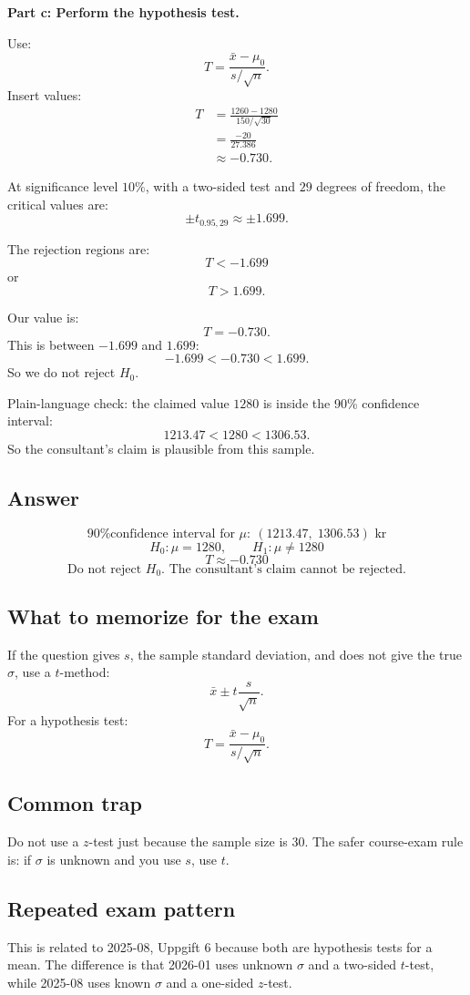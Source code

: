 \documentclass[11pt,a4paper]{article}
\begin{document}
\textbf{Part c: Perform the hypothesis test.}

Use:
\[
T=\frac{\bar{x}-\mu_0}{s/\sqrt{n}}.
\]
Insert values:
\begin{align*}
T
&=\frac{1260-1280}{150/\sqrt{30}}\\
&=\frac{-20}{27.386}\\
&\approx -0.730.
\end{align*}

At significance level \(10\%\), with a two-sided test and \(29\) degrees of freedom, the critical values are:
\[
\pm t_{0.95,29}\approx \pm 1.699.
\]

The rejection regions are:
\[
T<-1.699
\]
or
\[
T>1.699.
\]

Our value is:
\[
T=-0.730.
\]
This is between \(-1.699\) and \(1.699\):
\[
-1.699<-0.730<1.699.
\]
So we do not reject \(H_0\).

Plain-language check: the claimed value \(1280\) is inside the 90\% confidence interval:
\[
1213.47<1280<1306.53.
\]
So the consultant's claim is plausible from this sample.

\subsection*{Answer}
\[
\boxed{\text{90\% confidence interval for }\mu:\ (1213.47,\;1306.53)\text{ kr}}
\]
\[
\boxed{H_0:\mu=1280,\qquad H_1:\mu\ne 1280}
\]
\[
\boxed{T\approx -0.730}
\]
\[
\boxed{\text{Do not reject }H_0. \text{ The consultant's claim cannot be rejected.}}
\]

\subsection*{What to memorize for the exam}
If the question gives \(s\), the sample standard deviation, and does not give the true \(\sigma\), use a \(t\)-method:
\[
\bar{x}\pm t\frac{s}{\sqrt{n}}.
\]
For a hypothesis test:
\[
T=\frac{\bar{x}-\mu_0}{s/\sqrt{n}}.
\]

\subsection*{Common trap}
Do not use a \(z\)-test just because the sample size is 30. The safer course-exam rule is: if \(\sigma\) is unknown and you use \(s\), use \(t\).

\subsection*{Repeated exam pattern}
This is related to 2025-08, Uppgift 6 because both are hypothesis tests for a mean. The difference is that 2026-01 uses unknown \(\sigma\) and a two-sided \(t\)-test, while 2025-08 uses known \(\sigma\) and a one-sided \(z\)-test.
\end{document}
